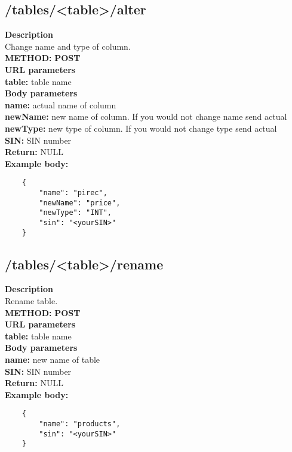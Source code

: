 \documentclass[a4paper, 12pt]{report}
\begin{document}
\subsection{/tables/<table>/alter}
\textbf{\color{redText} Description} \\
Change name and type of column. \\
\textbf{\color{redText} METHOD: } \textbf{POST} \\
\textbf{\color{redText} URL parameters} \\
\textbf{table: } table name\\
\textbf{\color{redText} Body parameters} \\
\textbf{name: } actual name of column\\
\textbf{newName: } new name of column. If you would not change name send actual\\
\textbf{newType: } new type of column. If you would not change type send actual\\
\textbf{SIN: } SIN number\\
\textbf{\color{redText} Return: } NULL\\
\textbf{\color{redText} Example body: }
\begin{lstlisting}
    {
        "name": "pirec",
        "newName": "price",
        "newType": "INT",
        "sin": "<yourSIN>"
    }
\end{lstlisting}

\subsection{/tables/<table>/rename}
\textbf{\color{redText} Description} \\
Rename table. \\
\textbf{\color{redText} METHOD: } \textbf{POST} \\
\textbf{\color{redText} URL parameters} \\
\textbf{table: } table name\\
\textbf{\color{redText} Body parameters} \\
\textbf{name: } new name of table\\
\textbf{SIN: } SIN number\\
\textbf{\color{redText} Return: } NULL\\
\textbf{\color{redText} Example body: }
\begin{lstlisting}
    {
        "name": "products",
        "sin": "<yourSIN>"
    }
\end{lstlisting}
\end{document}
